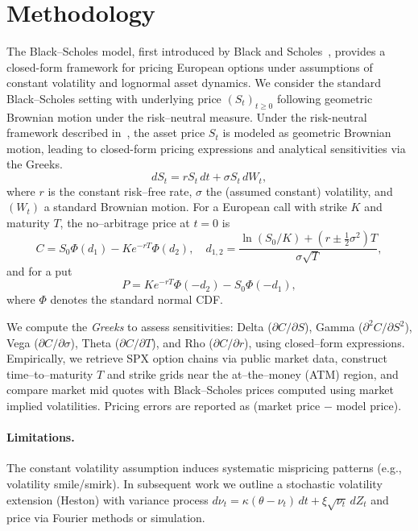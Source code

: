 \documentclass[12pt]{article}
\begin{document}
\section{Methodology}
The Black--Scholes model, first introduced by Black and Scholes~\cite{black1973pricing}, provides a closed-form framework for pricing European options under assumptions of constant volatility and lognormal asset dynamics. We consider the standard Black--Scholes setting with underlying price $(S_t)_{t\ge 0}$ following geometric Brownian motion under the
risk--neutral measure. Under the risk-neutral framework described in~\cite{black1973pricing}, the asset price $S_t$ is modeled as geometric Brownian motion, leading to closed-form pricing expressions and analytical sensitivities via the Greeks.
\begin{equation}
dS_t = r S_t\,dt + \sigma S_t\, dW_t,
\end{equation}
where $r$ is the constant risk--free rate, $\sigma$ the (assumed constant) volatility, and $(W_t)$ a standard Brownian motion.
For a European call with strike $K$ and maturity $T$, the no--arbitrage price at $t=0$ is
\begin{equation}
C = S_0 \Phi(d_1) - K e^{-rT} \Phi(d_2), \quad
d_{1,2} = \frac{\ln(S_0/K) + (r \pm \tfrac{1}{2}\sigma^2)T}{\sigma\sqrt{T}},
\end{equation}
and for a put
\begin{equation}
P = K e^{-rT} \Phi(-d_2) - S_0 \Phi(-d_1),
\end{equation}
where $\Phi$ denotes the standard normal CDF.

We compute the \emph{Greeks} to assess sensitivities: Delta ($\partial C/\partial S$), Gamma ($\partial^2 C/\partial S^2$),
Vega ($\partial C/\partial \sigma$), Theta ($\partial C/\partial T$), and Rho ($\partial C/\partial r$), using closed--form expressions.
Empirically, we retrieve SPX option chains via public market data, construct time--to--maturity $T$ and strike grids near the
at--the--money (ATM) region, and compare market mid quotes with Black--Scholes prices computed using market implied volatilities.
Pricing errors are reported as (market price $-$ model price).

\paragraph{Limitations.}
The constant volatility assumption induces systematic mispricing patterns (e.g., volatility smile/smirk). In subsequent work we outline
a stochastic volatility extension (Heston) with variance process
$d\nu_t = \kappa(\theta-\nu_t)\,dt + \xi \sqrt{\nu_t}\, dZ_t$ and price via Fourier methods or simulation.
\end{document}
